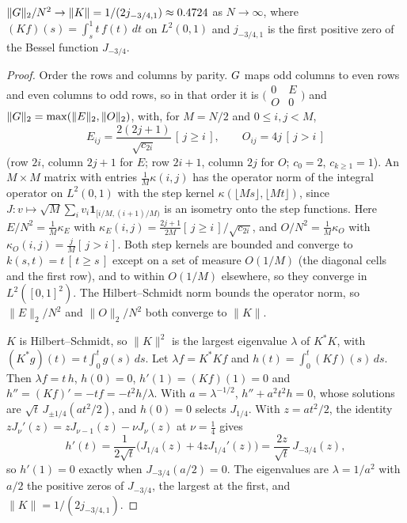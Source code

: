 \begin{theorem}
\label{thm:G-limit}
$\|G\|_2/N^2\to\|K\|=1/(2j_{-3/4,1})\approx0.4724$ as $N\to\infty$, where $(Kf)(s)=\int_s^1t\,f(t)\,dt$ on $L^2(0,1)$ and $j_{-3/4,1}$ is the first positive zero of the Bessel function $J_{-3/4}$.
\end{theorem}
\begin{proof}
Order the rows and columns by parity. $G$ maps odd columns to even rows and even columns to odd rows, so in that order it is $\bigl(\begin{smallmatrix}0&E\\O&0\end{smallmatrix}\bigr)$ and $\|G\|_2=\max(\|E\|_2,\|O\|_2)$, with, for $M=N/2$ and $0\le i,j<M$,
\begin{equation*}
    E_{ij}=\frac{2(2j+1)}{\sqrt{c_{2i}}}\,[\,j\ge i\,], \qquad O_{ij}=4j\,[\,j>i\,]
\end{equation*}
(row $2i$, column $2j+1$ for $E$; row $2i+1$, column $2j$ for $O$; $c_0=2$, $c_{k\ge1}=1$). An $M\times M$ matrix with entries $\tfrac1M\kappa(i,j)$ has the operator norm of the integral operator on $L^2(0,1)$ with the step kernel $\kappa(\lfloor Ms\rfloor,\lfloor Mt\rfloor)$, since $J:v\mapsto\sqrt M\sum_iv_i\mathbf 1_{[i/M,(i+1)/M)}$ is an isometry onto the step functions. Here $E/N^2=\tfrac1M\kappa_E$ with $\kappa_E(i,j)=\tfrac{2j+1}{2M}[\,j\ge i\,]/\sqrt{c_{2i}}$, and $O/N^2=\tfrac1M\kappa_O$ with $\kappa_O(i,j)=\tfrac jM[\,j>i\,]$. Both step kernels are bounded and converge to $k(s,t)=t\,[\,t\ge s\,]$ except on a set of measure $O(1/M)$ (the diagonal cells and the first row), and to within $O(1/M)$ elsewhere, so they converge in $L^2([0,1]^2)$. The Hilbert--Schmidt norm bounds the operator norm, so $\|E\|_2/N^2$ and $\|O\|_2/N^2$ both converge to $\|K\|$.

$K$ is Hilbert--Schmidt, so $\|K\|^2$ is the largest eigenvalue $\lambda$ of $K^*K$, with $(K^*g)(t)=t\int_0^tg(s)\,ds$. Let $\lambda f=K^*Kf$ and $h(t)=\int_0^t(Kf)(s)\,ds$. Then $\lambda f=t\,h$, $h(0)=0$, $h'(1)=(Kf)(1)=0$ and $h''=(Kf)'=-tf=-t^2h/\lambda$. With $a=\lambda^{-1/2}$, $h''+a^2t^2h=0$, whose solutions are $\sqrt t\,J_{\pm1/4}(at^2/2)$, and $h(0)=0$ selects $J_{1/4}$. With $z=at^2/2$, the identity $zJ_\nu'(z)=zJ_{\nu-1}(z)-\nu J_\nu(z)$ at $\nu=\tfrac14$ gives
\begin{equation*}
    h'(t)=\frac{1}{2\sqrt t}\bigl(J_{1/4}(z)+4zJ_{1/4}'(z)\bigr)=\frac{2z}{\sqrt t}\,J_{-3/4}(z),
\end{equation*}
so $h'(1)=0$ exactly when $J_{-3/4}(a/2)=0$. The eigenvalues are $\lambda=1/a^2$ with $a/2$ the positive zeros of $J_{-3/4}$, the largest at the first, and $\|K\|=1/(2j_{-3/4,1})$.
\end{proof}


